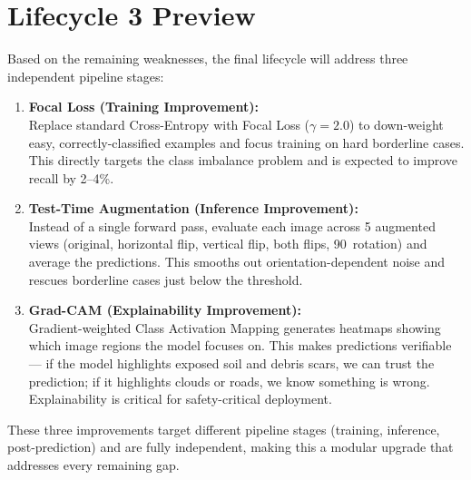 \documentclass[11pt]{article}
\begin{document}
\section{Lifecycle 3 Preview}

Based on the remaining weaknesses, the final lifecycle will address three independent pipeline stages:

\begin{enumerate}
    \item \textbf{Focal Loss (Training Improvement):}\\
          Replace standard Cross-Entropy with Focal Loss ($\gamma = 2.0$) to down-weight easy, correctly-classified examples and focus training on hard borderline cases. This directly targets the class imbalance problem and is expected to improve recall by 2--4\%.

    \item \textbf{Test-Time Augmentation (Inference Improvement):}\\
          Instead of a single forward pass, evaluate each image across 5 augmented views (original, horizontal flip, vertical flip, both flips, 90\textdegree\ rotation) and average the predictions. This smooths out orientation-dependent noise and rescues borderline cases just below the threshold.

    \item \textbf{Grad-CAM (Explainability Improvement):}\\
          Gradient-weighted Class Activation Mapping generates heatmaps showing which image regions the model focuses on. This makes predictions verifiable --- if the model highlights exposed soil and debris scars, we can trust the prediction; if it highlights clouds or roads, we know something is wrong. Explainability is critical for safety-critical deployment.
\end{enumerate}

\noindent These three improvements target different pipeline stages (training, inference, post-prediction) and are fully independent, making this a modular upgrade that addresses every remaining gap.
\end{document}

